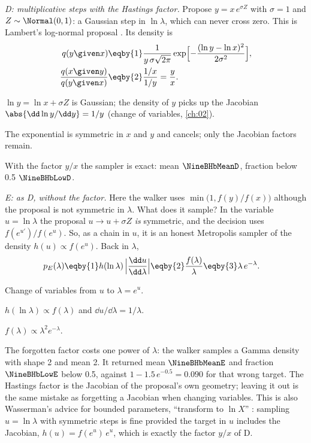 \emph{D: multiplicative steps with the Hastings factor.} Propose $y=x\,e^{\sigma Z}$ with
$\sigma=1$ and $Z\sim\Normal(0,1)$: a Gaussian step in $\ln\lambda$, which can never cross zero.
This is Lambert's log-normal proposal . Its density is
\begin{align}
  q(y\given x)
  &\eqby{1}\frac{1}{y\,\sigma\sqrt{2\pi}}\exp\Bigl[-\frac{(\ln y-\ln x)^2}{2\sigma^2}\Bigr],
  \nonumber\\
  \frac{q(x\given y)}{q(y\given x)}
  &\eqby{2}\frac{1/x}{1/y}
   =\frac{y}{x}.
  \label{9b:eq:lognormal-factor}
\end{align}
\begin{explain}
  \item $\ln y=\ln x+\sigma Z$ is Gaussian; the density of $y$ picks up the Jacobian
        $\abs{\dd\ln y/\dd y}=1/y$ (change of variables, \cref{ch:02}).
  \item The exponential is symmetric in $x$ and $y$ and cancels; only the Jacobian factors
        remain.
\end{explain}
With the factor $y/x$ the sampler is exact: mean $\NineBHbMeanD$, fraction below 0.5
$\NineBHbLowD$.

\emph{E: as D, without the factor.} Here the walker uses $\min\bigl(1,f(y)/f(x)\bigr)$ although
the proposal is not symmetric in $\lambda$. What does it sample? In the variable $u=\ln\lambda$
the proposal $u\to u+\sigma Z$ \emph{is} symmetric, and the decision uses $f(e^{u'})/f(e^u)$. So,
as a chain in $u$, it is an honest Metropolis sampler of the density $h(u)\propto f(e^u)$. Back
in $\lambda$,
\begin{align}
  p_E(\lambda)
  &\eqby{1}h(\ln\lambda)\,\Bigl\lvert\frac{\dd u}{\dd\lambda}\Bigr\rvert
   \eqby{2}\frac{f(\lambda)}{\lambda}
   \eqby{3}\lambda\,e^{-\lambda} .
  \label{9b:eq:no-hastings}
\end{align}
\begin{explain}
  \item Change of variables from $u$ to $\lambda=e^u$.
  \item $h(\ln\lambda)\propto f(\lambda)$ and $\dd u/\dd\lambda=1/\lambda$.
  \item $f(\lambda)\propto\lambda^2e^{-\lambda}$.
\end{explain}
The forgotten factor costs one power of $\lambda$: the walker samples a Gamma density with shape 2
and mean 2. It returned mean $\NineBHbMeanE$ and fraction $\NineBHbLowE$ below 0.5, against
$1-1.5\,e^{-0.5}=0.090$ for that wrong target. The Hastings factor is the Jacobian of the
proposal's own geometry; leaving it out is the same mistake as forgetting a Jacobian when
changing variables. This is also Wasserman's advice for bounded parameters, ``transform to
$\ln X$'' : sampling $u=\ln\lambda$ with symmetric steps is fine provided the
target in $u$ includes the Jacobian, $h(u)=f(e^u)\,e^u$, which is exactly the factor $y/x$ of D.

